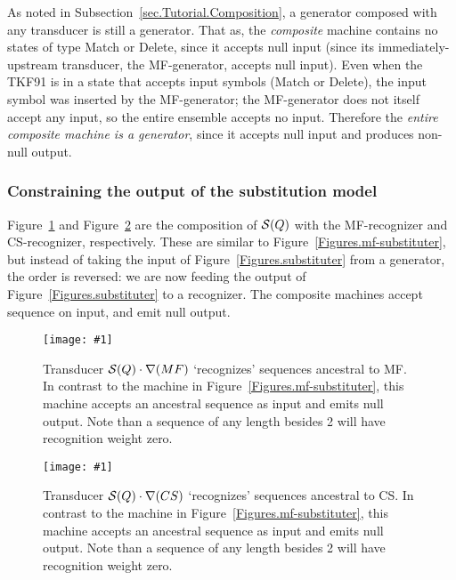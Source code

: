 \documentclass{article}
\newcommand{\secref}[1]{Subsection~\ref{sec.#1}}
\newcommand{\figref}[1]{Figure~\ref{Figures.#1}}
\newcommand{\figlabel}[1]{\label{Figures.#1}}
\newcommand{\easyfig}[4]{
\begin{figure}
\texttt{[image: \#1]}
\caption{ \figlabel{#3} #4}
\end{figure}}
\newcommand{\pdffig}[2]{\easyfig{#1-fig.pdf}{}{#1}{#2}}
\newcommand{\tallpdffig}[2]{\easyfig{#1-fig.pdf}{height=.8\textheight}{#1}{#2}}
\newcommand\substitute{{\cal S}}
\newcommand\tkf{{\cal B}}
\newcommand\recognize{\nabla}
\begin{document}
As noted in \secref{Tutorial.Composition}, a generator composed with any transducer is still a generator.
That as, the {\em composite} machine contains no states of
 type Match or Delete, since it accepts null input (since its immediately-upstream
transducer, the MF-generator, accepts null input).  
Even when the TKF91 is in a state that accepts input symbols (Match or Delete),
the input symbol was inserted by the MF-generator;
the MF-generator does not itself accept any input,
so the entire ensemble accepts no input.  
Therefore the {\em entire composite machine is a generator}, since it accepts null input
and produces non-null output.  


\subsubsection{Constraining the output of the substitution model}
\figref{substituter-mf}  and \figref{substituter-cs}  are the composition of $\substitute(Q)$ with the MF-recognizer and CS-recognizer, respectively.  
These are similar to 
\figref{mf-substituter},
but instead of taking the input of \figref{substituter} from a generator,
the order is reversed: we are now feeding the output of \figref{substituter} to a recognizer.
The composite machines accept sequence on input, and emit null output.


\pdffig{substituter-mf}{Transducer $\substitute(Q) \cdot \recognize(MF)$ `recognizes' sequences ancestral to MF.  In contrast to the machine in \figref{mf-substituter}, this machine accepts an ancestral sequence as input and emits null output.  Note than a sequence of any length besides 2 will have recognition weight zero. }

\pdffig{substituter-cs}{Transducer $\substitute(Q) \cdot \recognize(CS)$ `recognizes' sequences ancestral to CS.  In contrast to the machine in \figref{mf-substituter}, this machine accepts an ancestral sequence as input and emits null output.  Note than a sequence of any length besides 2 will have recognition weight zero. }



\end{document}

